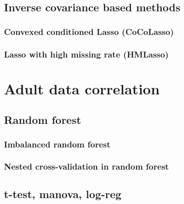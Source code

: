     \subsection{Inverse covariance based methods}
        \subsubsection{Convexed conditioned Lasso (CoCoLasso)}
        \subsubsection{Lasso with high missing rate (HMLasso)}

\section{Adult data correlation}
    \subsection{Random forest}
        \subsubsection{Imbalanced random forest}
        \subsubsection{Nested cross-validation in random forest}
    \subsection{t-test, manova, log-reg}


